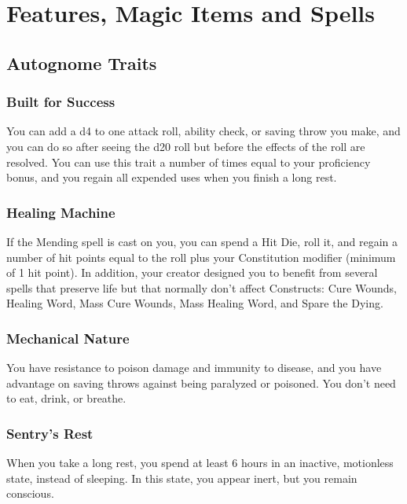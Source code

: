 \documentclass[letterpaper,openany,oneside,twocolumn]{book}
\begin{document}
\onecolumn


\rendercharactersheet

\renderbackgroundsheet

\renderspellsheet


\restoregeometry
\twocolumn

\chapter*{Features, Magic Items and Spells}

\section*{Autognome Traits}
\subsection*{Built for Success}
You can add a d4 to one attack roll, ability check, or saving throw you make, and you can do so after seeing the d20 roll but before the effects of the roll are resolved. You can use this trait a number of times equal to your proficiency bonus, and you regain all expended uses when you finish a long rest.
\subsection*{Healing Machine}
If the Mending spell is cast on you, you can spend a Hit Die, roll it, and regain a number of hit points equal to the roll plus your Constitution modifier (minimum of 1 hit point). In addition, your creator designed you to benefit from several spells that preserve life but that normally don't affect Constructs: Cure Wounds, Healing Word, Mass Cure Wounds, Mass Healing Word, and Spare the Dying.
\subsection*{Mechanical Nature}
You have resistance to poison damage and immunity to disease, and you have advantage on saving throws against being paralyzed or poisoned. You don't need to eat, drink, or breathe.
\subsection*{Sentry's Rest}
When you take a long rest, you spend at least 6 hours in an inactive, motionless state, instead of sleeping. In this state, you appear inert, but you remain conscious.
\end{document}
